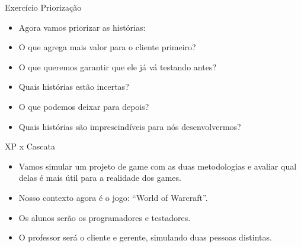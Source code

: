 \begin{frame}
\begin{block}{Exercício Priorização}
	 \begin{itemize}
		\item Agora vamos priorizar as histórias:

		\item O que agrega mais valor para o cliente primeiro?
		
		\item O que queremos garantir que ele já vá testando antes?
		
		\item Quais histórias estão incertas?
		
		\item O que podemos deixar para depois?
		
		\item Quais histórias são imprescindíveis para nós desenvolvermos?
	 \end{itemize}
\end{block}
\end{frame}

\begin{frame}
\begin{block}{XP x Cascata}
	 \begin{itemize}
		\item Vamos simular um projeto de game com as duas metodologias e avaliar qual delas é mais útil para a realidade dos games.

		\item Nosso contexto agora é o jogo: “World of Warcraft”.
		
		\item Os alunos serão os programadores e testadores.
		
		\item O professor será o cliente e gerente, simulando duas pessoas distintas.
	 \end{itemize}
\end{block}
\end{frame}